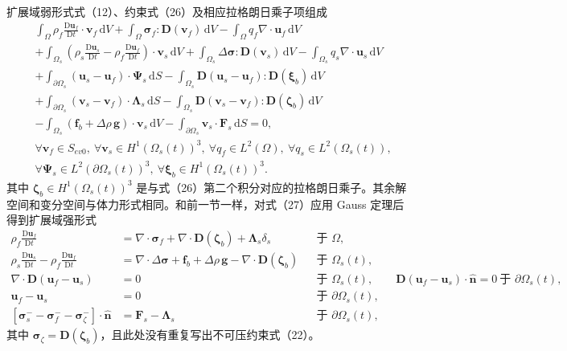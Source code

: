 \documentclass[UTF8,11pt,a4paper]{ctexart}
\newcommand{\dd}{\,\mathrm{d}}
\newcommand{\D}{\mathrm{D}}
\begin{document}
扩展域弱形式式（12）、约束式（26）及相应拉格朗日乘子项组成
\begin{align}
&\int_{\Omega}\rho_f\frac{\D\bm u_f}{\D t}\cdot\bm v_f\dd V
+\int_{\Omega}\bm\sigma_f:\bm D(\bm v_f)\dd V
-\int_{\Omega}q_f\nabla\cdot\bm u_f\dd V \nonumber\\
&+\int_{\Omega_s}\left(\rho_s\frac{\D\bm u_s}{\D t}-\rho_f\frac{\D\bm u_f}{\D t}\right)\cdot\bm v_s\dd V
+\int_{\Omega_s}\Delta\bm\sigma:\bm D(\bm v_s)\dd V
-\int_{\Omega_s}q_s\nabla\cdot\bm u_s\dd V \nonumber\\
&+\int_{\partial\Omega_s}(\bm u_s-\bm u_f)\cdot\bm\Psi_s\dd S
-\int_{\Omega_s}\bm D(\bm u_s-\bm u_f):\bm D(\bm\xi_b)\dd V \nonumber\\
&+\int_{\partial\Omega_s}(\bm v_s-\bm v_f)\cdot\bm\Lambda_s\dd S
-\int_{\Omega_s}\bm D(\bm v_s-\bm v_f):\bm D(\bm\zeta_b)\dd V \nonumber\\
&-\int_{\Omega_s}(\bm f_b+\Delta\rho\,\bm g)\cdot\bm v_s\dd V
-\int_{\partial\Omega_s}\bm v_s\cdot\bm F_s\dd S=0,\nonumber\\[-0.2em]
&\forall\bm v_f\in S_{ev0},\ \forall\bm v_s\in H^1(\Omega_s(t))^3,\ \forall q_f\in L^2(\Omega),\ \forall q_s\in L^2(\Omega_s(t)),\nonumber\\
&\forall\bm\Psi_s\in L^2(\partial\Omega_s(t))^3,\ \forall\bm\xi_b\in H^1(\Omega_s(t))^3. \tag{27}
\end{align}
其中 $\bm\zeta_b\in H^1(\Omega_s(t))^3$ 是与式（26）第二个积分对应的拉格朗日乘子。其余解空间和变分空间与体力形式相同。和前一节一样，对式（27）应用 Gauss 定理后得到扩展域强形式
\begin{align}
\rho_f\frac{\D\bm u_f}{\D t}
&=\nabla\cdot\bm\sigma_f+\nabla\cdot\bm D(\bm\zeta_b)+\bm\Lambda_s\delta_s &&\text{于 }\Omega, \tag{28}\\
\rho_s\frac{\D\bm u_s}{\D t}-\rho_f\frac{\D\bm u_f}{\D t}
&=\nabla\cdot\Delta\bm\sigma+\bm f_b+\Delta\rho\,\bm g-\nabla\cdot\bm D(\bm\zeta_b) &&\text{于 }\Omega_s(t), \tag{29}\\
\nabla\cdot\bm D(\bm u_f-\bm u_s)&=0 &&\text{于 }\Omega_s(t),\qquad
\bm D(\bm u_f-\bm u_s)\cdot\hat{\bm n}=0\ \text{于 }\partial\Omega_s(t), \tag{30}\\
\bm u_f-\bm u_s&=0 &&\text{于 }\partial\Omega_s(t), \tag{31}\\
\left[\bm\sigma_s^{-}-\bm\sigma_f^{-}-\bm\sigma_{\zeta}^{-}\right]\cdot\hat{\bm n}
&=\bm F_s-\bm\Lambda_s &&\text{于 }\partial\Omega_s(t), \tag{32}
\end{align}
其中 $\bm\sigma_{\zeta}=\bm D(\bm\zeta_b)$，且此处没有重复写出不可压约束式（22）。
\end{document}

